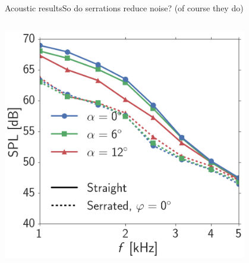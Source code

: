 \documentclass[xcolor=table,aspectratio=169]{beamer}
\begin{document}
\begin{frame}{Acoustic results}{So do serrations reduce noise? (of course they do)}

    \begin{columns}
        \vspace{-2cm}
        \centering
        \includegraphics[width=0.8\textwidth]{scripts/acoustics/article_images/case35_spectra_p0.png}
    \end{columns}
    
\end{frame}
\end{document}
